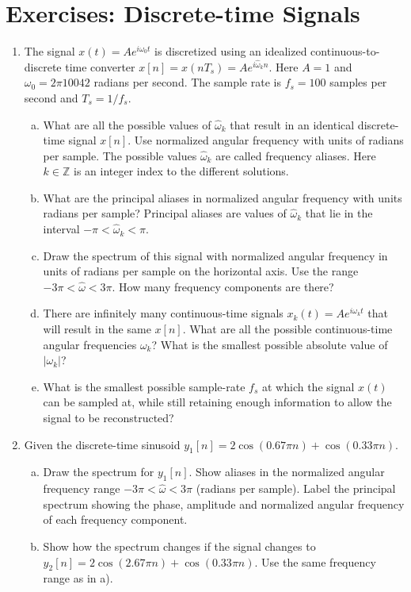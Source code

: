 \newpage
\section{Exercises: Discrete-time Signals}

\begin{enumerate}
\item The signal $x(t) = A e^{i\omega_0 t}$ is discretized using an idealized continuous-to-discrete time converter $x[n]=x(n T_s)=Ae^{i\hat{\omega}_{k}n}$. 
Here $A=1$ and $\omega_0=2\pi 10042$ radians per second. The sample rate is $f_s=100$ samples per second and $T_s=1/f_s$.
\begin{enumerate}[a)]
\item What are all the possible values of $\hat{\omega}_k$ that result in an identical discrete-time signal $x[n]$. 
Use normalized angular frequency with units of radians per sample. The possible values $\hat{\omega}_k$ are called frequency aliases. Here $k\in \mathbb{Z}$ is an integer index to the different solutions.
\item What are the principal aliases in normalized angular frequency with units radians per sample? Principal aliases are values of $\hat{\omega}_k$ that lie in the interval $-\pi < \hat{\omega}_k < \pi$.
\item Draw the spectrum of this signal with normalized angular frequency in units of radians per sample on the horizontal axis. Use the range $-3\pi < \hat{\omega} < 3\pi$. How many frequency components are there?
\item There are infinitely many continuous-time signals $x_k(t)=A e^{i\omega_k t}$ that will result in the same $x[n]$. What are all the possible continuous-time angular frequencies $\omega_k$? What is the smallest possible absolute value of $|\omega_k|$?
\item What is the smallest possible sample-rate $f_s$ at which the signal $x(t)$ can be sampled at, while still retaining enough information to allow the signal to be reconstructed?
\end{enumerate}

\item Given the discrete-time sinusoid $y_1[n] = 2 \cos(0.67 \pi n) + \cos(0.33 \pi n)$.
\begin{enumerate}[a)]
\item Draw the spectrum for $y_1[n]$. Show aliases in the normalized angular frequency range $-3\pi < \hat{\omega} < 3\pi$ (radians per sample). Label the principal spectrum showing the phase, amplitude and normalized angular frequency of each frequency component.
\item Show how the spectrum changes if the signal changes to $y_2[n] = 2 \cos(2.67 \pi n) + \cos(0.33 \pi n)$. Use the same frequency range as in a).
\end{enumerate}
  

\end{enumerate}

